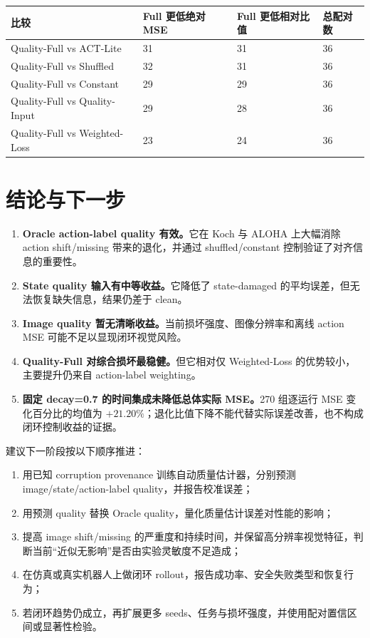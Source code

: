 \documentclass[11pt,a4paper]{ctexart}
\begin{document}
\begin{table}[htbp]
\centering
\small
\begin{tabularx}{\linewidth}{Y C{29mm} C{29mm} C{24mm}}
\toprule
比较 & Full 更低绝对 MSE & Full 更低相对比值 & 总配对数\\
\midrule
Quality-Full vs ACT-Lite & 31 & 31 & 36\\
Quality-Full vs Shuffled & 32 & 31 & 36\\
Quality-Full vs Constant & 29 & 29 & 36\\
Quality-Full vs Quality-Input & 29 & 28 & 36\\
Quality-Full vs Weighted-Loss & 23 & 24 & 36\\
\bottomrule
\end{tabularx}
\end{table}

\clearpage
\section{结论与下一步}

\begin{tcolorbox}[colback=panel,colframe=teal,boxrule=0.8pt,arc=1.5mm,title={\color{navy}\bfseries 主要结论}]
\begin{enumerate}
\item \textbf{Oracle action-label quality 有效。}它在 Koch 与 ALOHA 上大幅消除 action shift/missing 带来的退化，并通过 shuffled/constant 控制验证了对齐信息的重要性。
\item \textbf{State quality 输入有中等收益。}它降低了 state-damaged 的平均误差，但无法恢复缺失信息，结果仍差于 clean。
\item \textbf{Image quality 暂无清晰收益。}当前损坏强度、图像分辨率和离线 action MSE 可能不足以显现闭环视觉风险。
\item \textbf{Quality-Full 对综合损坏最稳健。}但它相对仅 Weighted-Loss 的优势较小，主要提升仍来自 action-label weighting。
\item \textbf{固定 decay=0.7 的时间集成未降低总体实际 MSE。}270 组逐运行 MSE 变化百分比的均值为 $+21.20\%$；退化比值下降不能代替实际误差改善，也不构成闭环控制收益的证据。
\end{enumerate}
\end{tcolorbox}

建议下一阶段按以下顺序推进：
\begin{enumerate}
\item 用已知 corruption provenance 训练自动质量估计器，分别预测 image/state/action-label quality，并报告校准误差；
\item 用预测 quality 替换 Oracle quality，量化质量估计误差对性能的影响；
\item 提高 image shift/missing 的严重度和持续时间，并保留高分辨率视觉特征，判断当前“近似无影响”是否由实验灵敏度不足造成；
\item 在仿真或真实机器人上做闭环 rollout，报告成功率、安全失败类型和恢复行为；
\item 若闭环趋势仍成立，再扩展更多 seeds、任务与损坏强度，并使用配对置信区间或显著性检验。
\end{enumerate}
\end{document}
